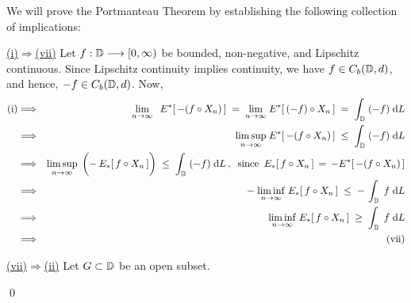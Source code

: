 \proof
We will prove the Portmanteau Theorem by establishing the following collection
of implications:
\begin{center}
\end{center}

\vskip 0.0cm \noindent
\underline{(i)\;$\Longrightarrow$\;(vii)}
\vskip 0.2cm \noindent
Let $f : \mathbb{D} \longrightarrow [0,\infty)$ be bounded, non-negative, and Lipschitz continuous.
Since Lipschitz continuity implies continuity, we have $f \in C_{b}(\mathbb{D},d)$, and hence, $-f \in C_{b}(\mathbb{D},d)$.
Now,
\begin{eqnarray*}
\textnormal{(i)}
&\Longrightarrow&
	{\color{white}1}\underset{n\rightarrow\infty}{\lim}\;\;\,E^{*}\!\left[\,-(f \circ X_{n})\,\right]
	\;=\; \underset{n\rightarrow\infty}{\lim}\;E^{*}\!\left[\,(-f) \circ X_{n}\,\right]
	\;=\; \int_{\D}\;(-f)\;\d L
\\
&\Longrightarrow&
	\underset{n\rightarrow\infty}{\limsup}\;E^{*}\!\left[\,-(f \circ X_{n})\,\right] \;\leq\; \int_{\D}\;(-f)\;\d L
\\
&\Longrightarrow&
	\underset{n\rightarrow\infty}{\limsup}\;
	\left(\overset{{\color{white}\vert}}{-}\,E_{*}\!\left[\,f \circ X_{n}\,\right]\right) \;\leq\; \int_{\D}\;(-f)\;\d L\,,
	\;\;\textnormal{since \,$E_{*}[\,f \circ X_{n}\,] \,=\, -E^{*}[\,-(f \circ X_{n})\,]$}
\\
&\Longrightarrow&
	-\;\underset{n\rightarrow\infty}{\liminf}\;E_{*}\!\left[\,f \circ X_{n}\,\right]
	\;\leq\; -\,\int_{\D}\;f\;\d L
\\
&\Longrightarrow&
	\underset{n\rightarrow\infty}{\liminf}\;E_{*}\!\left[\,f \circ X_{n}\,\right]
	\;\geq\; \int_{\D}\;f\;\d L
\\
&\Longrightarrow&
	\textnormal{(vii)}
\end{eqnarray*}

\vskip 0.5cm \noindent
\underline{(vii)\;$\Longrightarrow$\;(ii)}
\vskip 0.2cm \noindent
Let $G \subset \mathbb{D}$ be an open subset.


\qed



\renewcommand{\theenumi}{\roman{enumi}}
\renewcommand{\labelenumi}{\textnormal{(\theenumi)}$\;\;$}

